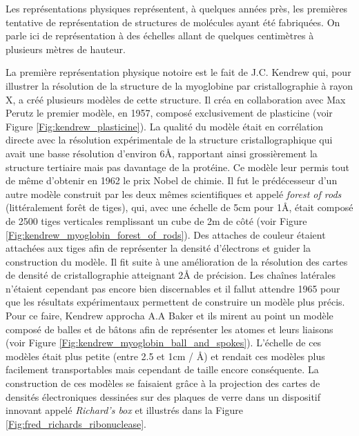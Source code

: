 
Les représentations physiques représentent, à quelques années près, les premières tentative de représentation de structures de molécules ayant été fabriquées. On parle ici de représentation à des échelles allant de quelques centimètres à plusieurs mètres de hauteur.

La première représentation physique notoire est le fait de J.C. Kendrew qui, pour illustrer la résolution de la structure de la myoglobine par cristallographie \cite{kendrew1958three} à rayon X, a créé plusieurs modèles de cette structure. Il créa en collaboration avec Max Perutz le premier modèle, en 1957, composé exclusivement de plasticine (voir Figure \ref{Fig:kendrew_plasticine}). La qualité du modèle était en corrélation directe avec la résolution expérimentale de la structure cristallographique qui avait une basse résolution d'environ 6\r{A}, rapportant ainsi grossièrement la structure tertiaire mais pas davantage de la protéine. Ce modèle leur permis tout de même d'obtenir en 1962 le prix Nobel de chimie. Il fut le prédécesseur d'un autre modèle construit par les deux mêmes scientifiques et appelé \textit{forest of rods} (littéralement forêt de tiges), qui, avec une échelle de 5cm pour 1\r{A}, était composé de 2500 tiges verticales remplissant un cube de 2m de côté (voir Figure \ref{Fig:kendrew_myoglobin_forest_of_rods}). Des attaches de couleur étaient attachées aux tiges afin de représenter la densité d'électrons et guider la construction du modèle. Il fit suite à une amélioration de la résolution des cartes de densité de cristallographie atteignant 2\r{A} de précision. Les chaînes latérales n'étaient cependant pas encore bien discernables et il fallut attendre 1965 pour que les résultats expérimentaux permettent de construire un modèle plus précis. Pour ce faire, Kendrew approcha A.A Baker et ils mirent au point un modèle composé de balles et de bâtons afin de représenter les atomes et leurs liaisons (voir Figure \ref{Fig:kendrew_myoglobin_ball_and_spokes}). L'échelle de ces modèles était plus petite (entre 2.5 et 1cm / \r{A}) et rendait ces modèles plus facilement transportables mais cependant de taille encore conséquente. La construction de ces modèles se faisaient grâce à la projection des cartes de densités électroniques dessinées sur des plaques de verre dans un dispositif innovant appelé \textit{Richard's box} et illustrés dans la Figure \ref{Fig:fred_richards_ribonuclease}.

